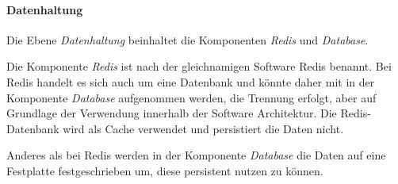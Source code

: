 \paragraph{Datenhaltung}
Die Ebene \textit{Datenhaltung} beinhaltet die Komponenten \textit{Redis} und \textit{Database}. 

Die Komponente \textit{Redis} ist nach der gleichnamigen Software Redis benannt. Bei Redis handelt es sich auch um eine Datenbank und könnte daher mit in der Komponente \textit{Database} aufgenommen werden, die Trennung erfolgt, aber auf Grundlage der Verwendung innerhalb der Software Architektur. Die Redis-Datenbank wird als Cache verwendet und persistiert die Daten nicht.

Anderes als bei Redis werden in der Komponente \textit{Database} die Daten auf eine Festplatte festgeschrieben um, diese persistent nutzen zu können.